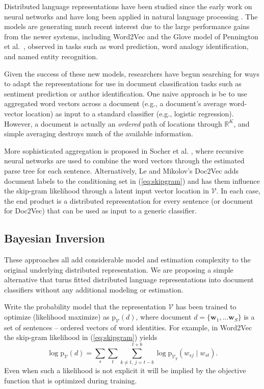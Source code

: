 \documentclass[11pt]{article}
\begin{document}
Distributed language representations have been studied since the early work on
neural networks \cite{rumelhart_learning_1986} and have long been applied in
natural language processing \cite{morin_hierarchical_2005}.  The models are
generating much recent interest due to the large performance gains from the
newer systems, including Word2Vec and the Glove model of Pennington et
al.~, observed in tasks such as word
prediction, word analogy identification, and named entity recognition.

Given the success of these new models, researchers have begun searching for
ways to adapt the representations for use in document classification tasks
such as sentiment prediction or author identification.  One  naive approach is be
to use aggregated word vectors across a document (e.g., a document's average
word-vector location) as input to a standard classifier (e.g.,
logistic regression).  However, a document is actually  an {\it ordered} path
of  locations through $\mathds{R}^K$, and simple averaging destroys much of the available
information.  

More sophisticated aggregation is proposed in Socher et al.
, where recursive neural
networks are used to combine the word vectors through the estimated parse tree
for each sentence.  Alternatively,  Le and Mikolov's Doc2Vec
 adds document labels to the conditioning set
in (\ref{eq:skipgram}) and has them influence the skip-gram likelihood through
a latent input vector location in $\mathcal{V}$. In each case, the end product
is a distributed representation for every sentence (or document for Doc2Vec)
that can be used as input to a generic classifier.

\subsection{Bayesian Inversion}

These approaches all add considerable model and estimation complexity to the
original underlying distributed representation.  We are proposing a
simple alternative that turns fitted distributed language representations into
document classifiers without any additional modeling or estimation.  

Write the probability model that the representation $\mathcal{V}$ has been
trained to optimize (likelihood maximize) as $\mathrm{p}_{ \mathcal{V}}(d )$,
where document $d = \{\mathbf{w}_1, ... \mathbf{w}_S\}$ is a set of sentences 
-- ordered vectors of word identities.  
For example, in Word2Vec the skip-gram likelihood in
(\ref{eq:skipgram}) yields
\begin{equation}\label{eq:fulllhd}
\log\mathrm{p}_{ \mathcal{V}}(d) = \sum_s \sum_{t} \sum_{k\neq t,~j=t-b}^{t+b} 
\log\mathrm{p}_{ \mathcal{V}_y}(w_{sj}\mid w_{st} ).
\end{equation}
Even when such a likelihood is not explicit it will be implied by the objective function that is optimized during training.
\end{document}
